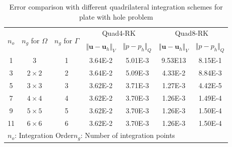 \begin{table}[!htp]
\centering
\caption{Error comparison with different quadrilateral integration schemes for plate with hole problem}
\label{tab_gauss_2}
\begin{tabular}{ccccccc}
\toprule
\multirow{2}{*}{$n_o$} & \multirow{2}{*}{$n_g$ for $\Omega$} & \multirow{2}{*}{$n_g$ for $\Gamma$} & \multicolumn{2}{c}{Quad4-RK} & \multicolumn{2}{c}{Quad8-RK} \\
\shortstack{} & \shortstack{} & \shortstack{} & $\Vert \boldsymbol u-\boldsymbol u_h \Vert_V$ & $\Vert p-p_h \Vert_Q$ & $\Vert \boldsymbol u-\boldsymbol u_h \Vert_V$ & $\Vert p-p_h \Vert_Q$ \\
\midrule
1 & 3 & 1 & 3.64E-2 & 5.01E-3 & 9.53E13 & 8.15E-1 \\
3 & $2\times2$ & 2 & 3.64E-2 & 5.09E-3 & 4.33E-2 & 8.84E-3 \\
5 & $3\times3$ & 3 & 3.62E-2 & 3.71E-3 & 1.27E-3 & 4.42E-5 \\
7 & $4\times4$ & 4 & 3.62E-2 & 3.70E-3 & 1.26E-3 & 1.49E-4 \\
9 & $5\times5$ & 5 & 3.62E-2 & 3.70E-3 & 1.26E-3 & 1.50E-4 \\
11 & $6\times6$ & 6 & 3.62E-2 & 3.70E-3 & 1.26E-3 & 1.50E-4 \\
\multicolumn{7}{l}{\footnotesize{$n_o$: Integration Order\quad $n_g$: Number of integration points}} \\
\bottomrule
\end{tabular}
\end{table}
